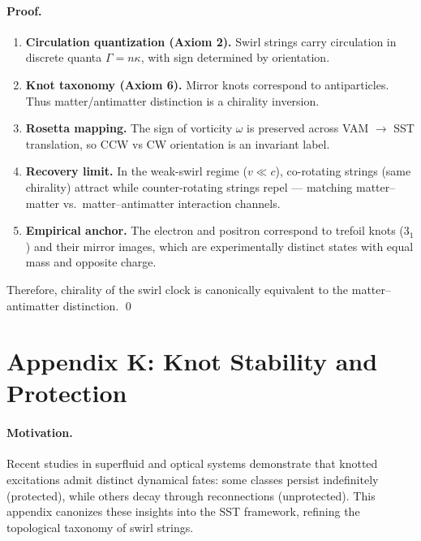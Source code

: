 \documentclass[10pt,reprint,aps,onecolumn,nofootinbib]{revtex4-2}
\begin{document}
    \paragraph{Proof.}
        \begin{enumerate}
            \item \textbf{Circulation quantization (Axiom 2).}
            Swirl strings carry circulation in discrete quanta $\Gamma = n\kappa$,
            with sign determined by orientation.
            \item \textbf{Knot taxonomy (Axiom 6).}
            Mirror knots correspond to antiparticles.
            Thus matter/antimatter distinction is a chirality inversion.
            \item \textbf{Rosetta mapping.}
            The sign of vorticity $\omega$ is preserved across VAM $\to$ SST translation,
            so CCW vs CW orientation is an invariant label.
            \item \textbf{Recovery limit.}
            In the weak-swirl regime ($v \ll c$), co-rotating strings (same chirality)
            attract while counter-rotating strings repel — matching matter–matter vs.\ matter–antimatter
            interaction channels.
            \item \textbf{Empirical anchor.}
            The electron and positron correspond to trefoil knots ($3_1$) and their mirror images,
            which are experimentally distinct states with equal mass and opposite charge.
        \end{enumerate}
        Therefore, chirality of the swirl clock is canonically equivalent to the matter–antimatter distinction.
        \qed


    \section*{Appendix K: Knot Stability and Protection}
    \label{app:knot_protection}

    \paragraph{Motivation.}
        Recent studies in superfluid and optical systems demonstrate that knotted excitations admit distinct dynamical fates: some classes persist indefinitely (protected), while others decay through reconnections (unprotected). This appendix canonizes these insights into the SST framework, refining the topological taxonomy of swirl strings.
\end{document}
